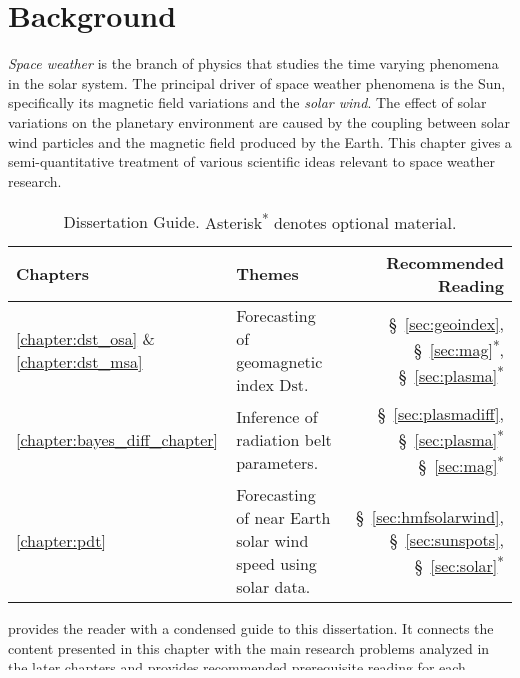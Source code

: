 \chapter{Background}\label{chapter:preliminaries}

\emph{Space weather} is the branch of physics that studies the time varying phenomena in the solar 
system. The principal driver of space weather phenomena is the Sun, specifically its magnetic field 
variations and the \emph{solar wind}. The effect of solar variations on the planetary environment 
are caused by the coupling between solar wind particles and the magnetic field produced by the 
Earth. This chapter gives a semi-quantitative treatment of various scientific ideas relevant to 
space weather research.

\begin{table}
    \centering
    \begin{tabular}{l p{} r}
        \hline
        \textbf{Chapters} & \textbf{Themes} & \textbf{Recommended Reading}\\
        \hline
        \vspace{5pt}
        \ref{chapter:dst_osa} \& \ref{chapter:dst_msa} & Forecasting of geomagnetic index $\mathrm{Dst}$. & \S~\ref{sec:geoindex}, \S~\ref{sec:mag}\textsuperscript{*}, \S~\ref{sec:plasma}\textsuperscript{*} \\
        \ref{chapter:bayes_diff_chapter} & Inference of radiation belt parameters. & \S~\ref{sec:plasmadiff}, \S~\ref{sec:plasma}\textsuperscript{*} \S~\ref{sec:mag}\textsuperscript{*} \\
        \ref{chapter:pdt} & Forecasting of near Earth solar wind speed using solar data. & \S~\ref{sec:hmfsolarwind}, \S~\ref{sec:sunspots}, \S~\ref{sec:solar}\textsuperscript{*}\\
        \hline
    \end{tabular}
    \caption{Dissertation Guide. {\small Asterisk\textsuperscript{*} denotes optional material.}}
    \label{table:chapterguide}
\end{table}

 provides the reader with a condensed guide to this dissertation. 
It connects the content presented in this chapter with the main research problems analyzed in the 
later chapters and provides recommended prerequisite reading for each chapter.

 describes space plasmas and their properties.  provides some 
background about the Sun and the solar wind which is the driver for all space weather phenomena. 
This is used in the solar wind prediction task considered in \cref{chapter:pdt}. 
 introduces the plasma diffusion model (\cref{eq:fokker}) and its simplified 
radial diffusion system (\cref{eq:radialDiff}) which is used as the underlying physical model for 
\cref{chapter:bayes_diff_chapter}.  introduces the \emph{magnetosphere}, giving 
context for \cref{chapter:dst_osa,chapter:dst_msa}. 


